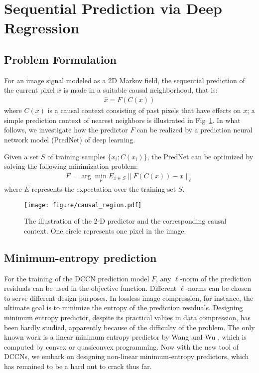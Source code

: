 \documentclass{article}
\begin{document}


\section{Sequential Prediction via Deep Regression}

\subsection{Problem Formulation}
For an image signal modeled as a 2D Markov field, the sequential prediction of the current pixel $x$ is made in a suitable causal neighborhood, that is:
\begin{align}
	\hat{x} = F(C(x))
\end{align}
where $C(x)$ is a causal context consisting of past pixels that have effects on $x$; a simple prediction context of nearest neighbors is illustrated in Fig~\ref{fig:causal}.  In what follows, we investigate how the predictor $F$ can be realized by a prediction neural network model (PredNet) of deep learning.

Given a set $S$ of training samples $\{ x_i ; C(x_i) \}$, the PredNet can be optimized by solving the following minimization problem:
\begin{align}
	F = \arg \min_F E_{x\in S} \| F(C(x)) - x \|_\ell
\end{align}
where $E$ represents the expectation over the training set $S$.

\begin{figure}
	\centering
	\texttt{[image: figure/causal\_region.pdf]}
	\caption{The illustration of the 2-D predictor and the corresponding causal context. One circle represents one pixel in the image. }
	\label{fig:causal}
\end{figure}


\subsection{Minimum-entropy prediction}
For the training of the DCCN prediction model $F$, any $\ell$-norm of the prediction residuals can be used in the objective function.  Different $\ell$-norms can be chosen to serve different design purposes.  In lossless image compression, for instance, the ultimate goal is to minimize the entropy of the prediction residuals.  Designing minimum entropy predictor, despite its practical values in data compression, has been hardly studied, apparently because of the difficulty of the problem.  The only known work is a linear minimum entropy predictor by Wang and Wu \cite{wang2007}, which is computed by convex or quasiconvex programming.  Now with the new tool of DCCNs, we embark on designing non-linear minimum-entropy predictors, which has remained to be a hard nut to crack thus far.
\end{document}

